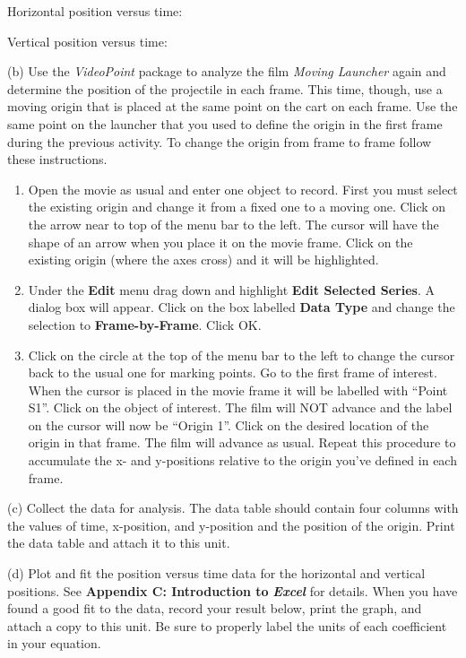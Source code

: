 Horizontal position versus time:
\vspace{10mm}

Vertical position versus time:
\vspace{10mm}

(b) Use the \emph{VideoPoint} package to analyze the film \emph{Moving
Launcher} again and determine the position of the projectile in each
frame. This time, though, use a moving origin that is placed
at the same point on the cart on each frame. Use the same point on
the launcher that you used to define the origin in the first frame
during the previous activity. To change the origin from frame to frame
follow these instructions.

\begin{enumerate}
\item Open the movie as usual and enter one object to record. First you
must select the existing origin and change it from a fixed one to
a moving one. Click on the arrow near to top of the menu bar to the
left. The cursor will have the shape of an arrow when you place it
on the movie frame. Click on the existing origin (where the axes cross)
and it will be highlighted.
\item Under the \textbf{Edit} menu drag down and highlight \textbf{Edit
Selected Series}. A dialog box will appear. Click on the box labelled
\textbf{Data Type} and change the selection to \textbf{Frame-by-Frame}.
Click OK.
\item Click on the circle at the top of the menu bar to the left to change
the cursor back to the usual one for marking points. Go to the first
frame of interest. When the cursor is placed in the movie frame it
will be labelled with {}``Point S1''. Click on the object of interest.
The film will NOT advance and the label on the cursor will now be
{}``Origin 1''. Click on the desired location of the origin in that
frame. The film will advance as usual. Repeat this procedure to accumulate
the x- and y-positions relative to the origin you've defined in each
frame.
\end{enumerate}
(c) Collect the data for analysis. The data table should contain four
columns with the values of time, x-position, and y-position and the
position of the origin. Print the data table and attach it to this unit.

(d) Plot and fit the position versus time data for the horizontal
and vertical positions. See \textbf{Appendix C: Introduction to} \textbf{\emph{Excel}}
for details. When you have found a good fit to the data, record your
result below, print the graph, and attach a copy to this unit. Be
sure to properly label the units of each coefficient in your equation.

